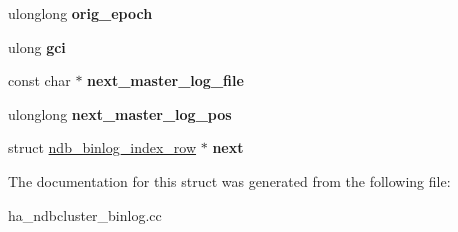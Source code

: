 \begin{DoxyCompactItemize}
\item 
\mbox{\label{structndb__binlog__index__row_a850916c33f4214d78e09d172729c3720}} 
ulonglong {\bfseries orig\+\_\+epoch}
\item 
\mbox{\label{structndb__binlog__index__row_ac784b0122921335783cf41b92014bff7}} 
ulong {\bfseries gci}
\item 
\mbox{\label{structndb__binlog__index__row_ad53621a1f949420a136102773ecf8521}} 
const char $\ast$ {\bfseries next\+\_\+master\+\_\+log\+\_\+file}
\item 
\mbox{\label{structndb__binlog__index__row_acc39ed474b49bce06d20bfa707ed7a86}} 
ulonglong {\bfseries next\+\_\+master\+\_\+log\+\_\+pos}
\item 
\mbox{\label{structndb__binlog__index__row_a9e0ff70ffffd5eb9ee0ff335ff2e40bf}} 
struct \mbox{\hyperlink{structndb__binlog__index__row}{ndb\+\_\+binlog\+\_\+index\+\_\+row}} $\ast$ {\bfseries next}
\end{DoxyCompactItemize}


The documentation for this struct was generated from the following file\+:\begin{DoxyCompactItemize}
\item 
ha\+\_\+ndbcluster\+\_\+binlog.\+cc\end{DoxyCompactItemize}
